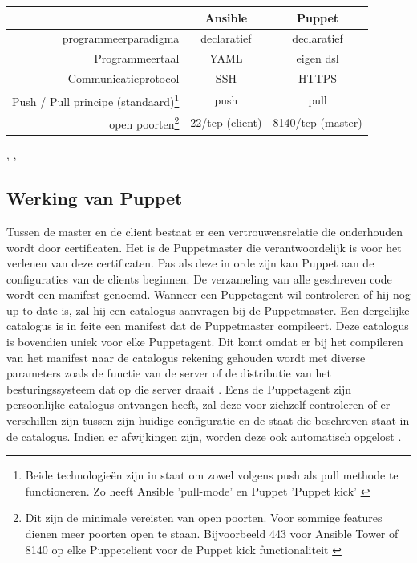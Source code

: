 \begin{minipage}{15cm}
\begin{tabular}{ r |c c }
& \textbf{Ansible} & \textbf{Puppet} \\
  \hline	  		
\gls{programmeerparadigma}  & declaratief & declaratief  \\
   \hline
 Programmeertaal & YAML & eigen \gls{dsl}  \\
     \hline
   Communicatieprotocol & SSH & HTTPS \\
   \hline
  Push / Pull principe (standaard)\footnote{Beide technologie\"en zijn in staat om zowel volgens push als pull methode te functioneren. Zo heeft Ansible 'pull-mode' en Puppet 'Puppet kick' \autocite{ansiblepull]} \autocite{puppetkick}} & \gls{push} & \gls{pull} \\
   \hline
   open poorten\footnote{Dit zijn de minimale vereisten van open poorten. Voor sommige features dienen meer poorten open te staan. Bijvoorbeeld 443 voor Ansible Tower of 8140 op elke Puppetclient voor de Puppet kick functionaliteit \autocite{puppetkick} }  & 22/tcp (client) & 8140/tcp (master)\\
  \end{tabular}
  \end{minipage}   



 \textcite{languagePuppet}, \textcite{masterproef}, \textcite{ansibledoc}

\subsection{Werking van Puppet}

Tussen de master en de client bestaat er een vertrouwensrelatie die onderhouden wordt door certificaten. Het is de Puppetmaster die verantwoordelijk is voor het verlenen van deze certificaten. Pas als deze in orde zijn kan Puppet  aan de configuraties van de clients beginnen. De verzameling van alle geschreven code wordt een manifest genoemd. Wanneer een Puppetagent wil controleren of hij nog up-to-date is, zal hij een catalogus aanvragen bij de Puppetmaster. Een dergelijke catalogus is in feite een manifest dat de Puppetmaster compileert. Deze catalogus is bovendien uniek voor elke Puppetagent. Dit komt omdat er bij het compileren van het manifest naar de catalogus rekening gehouden wordt met diverse parameters zoals de functie van de server of de distributie van het besturingssysteem dat op die server draait \autocite{Puppetlanguagecatalog}. Eens de Puppetagent zijn persoonlijke catalogus ontvangen heeft, zal deze voor zichzelf controleren of er verschillen zijn tussen zijn huidige configuratie en de staat die beschreven staat in de catalogus. Indien er afwijkingen zijn, worden deze ook automatisch opgelost \autocite{puppetdoc}.

